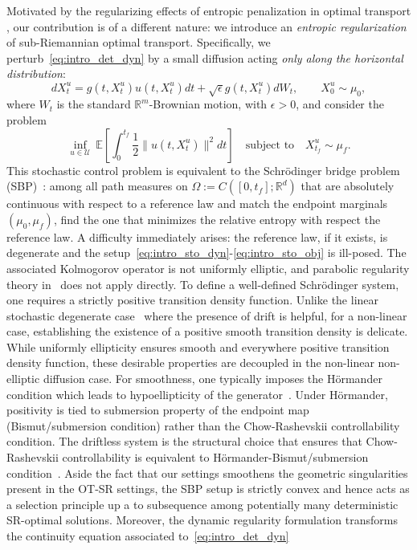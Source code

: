 \documentclass{amsart}
\numberwithin{equation}{section}
\newcommand{\R}{\mathbb{R}}
\newcommand{\E}{\mathbb{E}}
\begin{document}
Motivated by the regularizing effects of entropic penalization in optimal transport \cite{cuturi2013sinkhorn}, our contribution is of a different nature: we introduce an \emph{entropic regularization} of sub-Riemannian optimal transport. Specifically, we perturb~\eqref{eq:intro_det_dyn} by a small diffusion acting \emph{only along the horizontal distribution}:
\begin{equation}\label{eq:intro_sto_dyn}
dX_t^u = g(t,X_t^u) u(t,X_t^u) dt + \sqrt{\epsilon} g(t,X_t^u) dW_t,\qquad X_0^u\sim\mu_0,
\end{equation}
where $W_t$ is the standard $\R^m$-Brownian motion, with $\epsilon>0$, and consider the problem
\begin{equation}\label{eq:intro_sto_obj}
\inf_{u\in\mathcal U}\ \E\!\left[\int_0^{t_f}\frac12\|u(t,X_t^u)\|^2dt\right]
\quad\text{subject to}\quad X_{t_f}^u\sim\mu_f.
\end{equation}
This stochastic control problem is equivalent to the Schr\"odinger bridge problem (SBP)~\cite{schrodinger1931umkehrung}: among all path measures on $\Omega:=C([0,t_f];\R^d)$ that are absolutely continuous with respect to a reference law and match the endpoint marginals $(\mu_0,\mu_f)$, find the one that minimizes the relative entropy with respect the reference law. A difficulty immediately arises: the reference law, if it exists, is degenerate and the setup~\eqref{eq:intro_sto_dyn}-\eqref{eq:intro_sto_obj} is ill-posed. The associated Kolmogorov operator is not uniformly elliptic, and parabolic regularity theory in~\cite{dai1991stochastic,Leonard2012} does not apply directly.  To define a well-defined   Schr\"odinger system, one requires a strictly positive transition density function. Unlike the linear stochastic degenerate case~\cite{adu2022optimal,adu2024schrodinger,chen2021optimal,chen2016optimal} where the presence of drift is helpful, for a non-linear case, establishing the existence of a positive smooth transition density is delicate. While uniformly ellipticity ensures smooth and everywhere positive transition density function, these desirable properties are decoupled in the non-linear non-elliptic diffusion case. For smoothness, one typically imposes the H\"ormander condition which leads to hypoellipticity of the generator~\cite{Hormander1967}. Under H\"ormander, positivity is tied to submersion property of the endpoint map~\cite{leandre2005positivity,arous1991decroissance} (Bismut/submersion condition) rather than the Chow-Rashevskii controllability condition. The driftless system is the structural choice that ensures that Chow-Rashevskii controllability is equivalent to H\"ormander-Bismut/submersion condition~\cite{arous1991decroissance}. Aside the fact that our settings smoothens the geometric singularities present in the OT-SR settings, the SBP setup is strictly convex and hence acts as a  selection principle up a to subsequence among potentially many deterministic SR-optimal solutions. Moreover, the dynamic regularity formulation transforms the continuity equation associated to~\eqref{eq:intro_det_dyn} 
\end{document}
